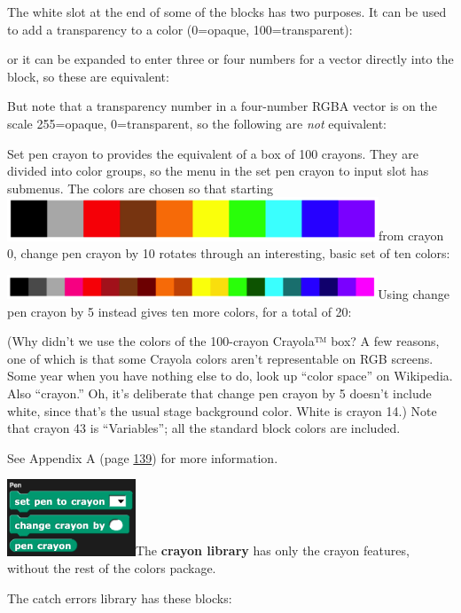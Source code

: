 The white slot at the end of some of the blocks has two purposes. It can
be used to add a transparency to a color (0=opaque, 100=transparent):

or it can be expanded to enter three or four numbers for a vector
directly into the block, so these are equivalent:

But note that a transparency number in a four-number RGBA vector is on
the scale 255=opaque, 0=transparent, so the following are \emph{not}
equivalent:

Set pen crayon to provides the equivalent of a box of 100 crayons. They
are divided into color groups, so the menu in the set pen crayon to
input slot has submenus. The colors are chosen so that starting
\includegraphics[width=4.36528in,height=0.51528in]{media/image440.png}from
crayon 0, change pen crayon by 10 rotates through an interesting, basic
set of ten colors:

\includegraphics[width=4.35556in,height=0.28194in]{media/image441.png}Using
change pen crayon by 5 instead gives ten more colors, for a total of 20:

(Why didn't we use the colors of the 100-crayon Crayola™ box? A few
reasons, one of which is that some Crayola colors aren't representable
on RGB screens. Some year when you have nothing else to do, look up
``color space'' on Wikipedia. Also ``crayon.'' Oh, it's deliberate that
change pen crayon by 5 doesn't include white, since that's the usual
stage background color. White is crayon 14.) Note that crayon 43 is
``Variables''; all the standard block colors are included.

See Appendix A (page \hyperref[crayons-and-color-numbers]{139}) for more
information.

\includegraphics[width=1.51in,height=0.9in]{media/image442.png}The
\textbf{crayon library} has only the crayon features, without the rest
of the colors package.

The catch errors library has these blocks:

